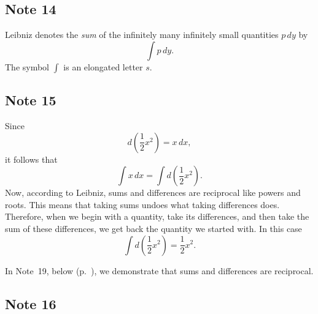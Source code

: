 \documentclass[polutonikogreek,english,twoside,openright]{article}
\begin{document}
\subsection*{Note 14}
\label{crg14}

Leibniz denotes the {\em sum} of the infinitely many infinitely small quantities $p\,dy$ by
$$\int\! p\,dy.$$
The symbol $\int$ is an elongated letter $s$.

\subsection*{Note 15}
\label{crg15}

Since 
$$d\left(\frac{1}{2}x^2\right) = x\,dx,$$
it follows that
$$\int\!x\,dx = \int\!d\left(\frac{1}{2}x^2\right).$$
Now, according to Leibniz, sums and differences are reciprocal like
powers and roots.  This means that taking sums undoes what taking
differences does.  Therefore, when we begin with a quantity, take its
differences, and then take the sum of these differences, we get back
the quantity we started with.  In this case
$$ \int\!d\left(\frac{1}{2}x^2\right) = \frac{1}{2}x^2.$$

In Note~19, below (p.~\pageref{crg19}), we demonstrate that sums and differences are reciprocal.

\subsection*{Note 16}
\label{crg16}
\end{document}
